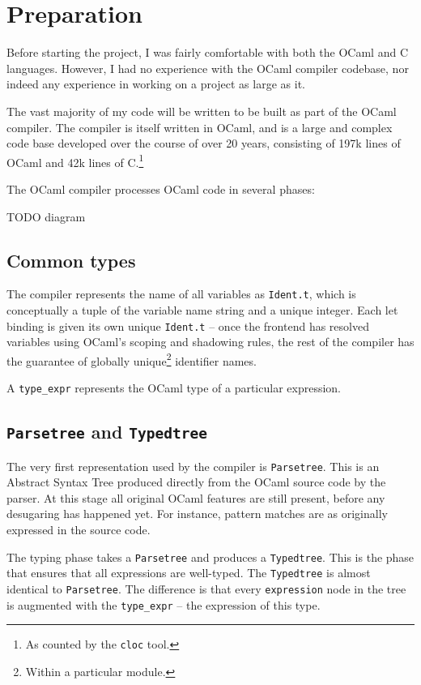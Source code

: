 \documentclass[12pt,a4paper,twoside,openright]{report}
\begin{document}
\chapter{Preparation}

Before starting the project, I was fairly comfortable with both the OCaml and
C languages. However, I had no experience with the OCaml compiler codebase, nor
indeed any experience in working on a project as large as it.

The vast majority of my code will be written to be built as part of the OCaml
compiler. The compiler is itself written in OCaml, and is a large and complex
code base developed over the course of over 20 years, consisting of 197k lines
of OCaml and 42k lines of C.\footnote{As counted by the \lstinline!cloc! tool.}

The OCaml compiler processes OCaml code in several phases:

TODO diagram

\section{Common types}\label{common-types}

The compiler represents the name of all variables as \lstinline!Ident.t!, which
is conceptually a tuple of the variable name string and a unique integer. Each
let binding is given its own unique \lstinline!Ident.t! -- once the frontend
has resolved variables using OCaml's scoping and shadowing rules, the rest of
the compiler has the guarantee of globally unique\footnote{Within a particular
module.} identifier names.

A \lstinline!type_expr! represents the OCaml type of a particular expression.

\section{\texttt{Parsetree} and \texttt{Typedtree}}

The very first representation used by the compiler is \lstinline!Parsetree!.
This is an Abstract Syntax Tree produced directly from the OCaml source code by
the parser. At this stage all original OCaml features are still present, before
any desugaring has happened yet. For instance, pattern matches are as
originally expressed in the source code.

The typing phase takes a \lstinline!Parsetree! and produces a
\lstinline!Typedtree!. This is the phase that ensures that all expressions are
well-typed. The \lstinline!Typedtree! is almost identical to
\lstinline!Parsetree!. The difference is that every \lstinline!expression! node
in the tree is augmented with the \lstinline!type_expr! -- the expression of
this type.
\end{document}

